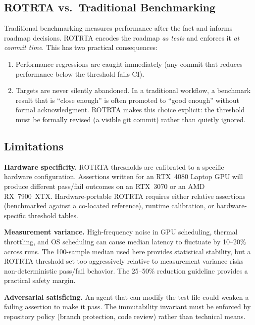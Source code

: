 \documentclass[conference]{IEEEtran}
\begin{document}
\subsection{ROTRTA vs.\ Traditional Benchmarking}

Traditional benchmarking measures performance after the fact and informs
roadmap decisions.  ROTRTA encodes the roadmap \emph{as tests} and enforces
it \emph{at commit time}.  This has two practical consequences:

\begin{enumerate}
  \item Performance regressions are caught immediately (any commit that
        reduces performance below the threshold fails CI).
  \item Targets are never silently abandoned.  In a traditional workflow,
        a benchmark result that is ``close enough'' is often promoted to
        ``good enough'' without formal acknowledgment.  ROTRTA makes this
        choice explicit: the threshold must be formally revised (a visible
        git commit) rather than quietly ignored.
\end{enumerate}

\subsection{Limitations}

\textbf{Hardware specificity.}  ROTRTA thresholds are calibrated to a
specific hardware configuration.  Assertions written for an RTX~4080 Laptop
GPU will produce different pass/fail outcomes on an RTX~3070 or an AMD
RX~7900~XTX.  Hardware-portable ROTRTA requires either relative assertions
(benchmarked against a co-located reference), runtime calibration, or
hardware-specific threshold tables.

\textbf{Measurement variance.}  High-frequency noise in GPU scheduling,
thermal throttling, and OS scheduling can cause median latency to fluctuate
by 10--20\% across runs.  The 100-sample median used here provides
statistical stability, but a ROTRTA threshold set too aggressively relative
to measurement variance risks non-deterministic pass/fail behavior.  The
25--50\% reduction guideline provides a practical safety margin.

\textbf{Adversarial satisficing.}  An agent that can modify the test file
could weaken a failing assertion to make it pass.  The immutability invariant
must be enforced by repository policy (branch protection, code review) rather
than technical means.
\end{document}
